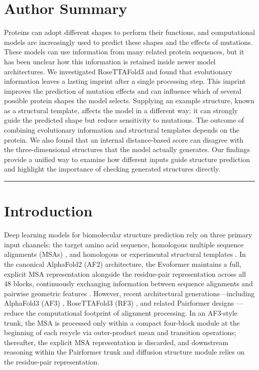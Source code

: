 \documentclass[10pt,a4paper]{article}
\begin{document}
\section*{Author Summary}
Proteins can adopt different shapes to perform their functions, and computational models are increasingly used to predict these shapes and the effects of mutations. These models can use information from many related protein sequences, but it has been unclear how this information is retained inside newer model architectures. We investigated RoseTTAFold3 and found that evolutionary information leaves a lasting imprint after a single processing step. This imprint improves the prediction of mutation effects and can influence which of several possible protein shapes the model selects. Supplying an example structure, known as a structural template, affects the model in a different way: it can strongly guide the predicted shape but reduce sensitivity to mutations. The outcome of combining evolutionary information and structural templates depends on the protein. We also found that an internal distance-based score can disagree with the three-dimensional structures that the model actually generates. Our findings provide a unified way to examine how different inputs guide structure prediction and highlight the importance of checking generated structures directly.

\noindent\textcolor{rulecolor}{\rule{\textwidth}{0.8pt}}

\section{Introduction}

Deep learning models for biomolecular structure prediction rely on three primary input channels: the target amino acid sequence, homologous multiple sequence alignments (MSAs) \citep{marks2012protein,senior2020improved}, and homologous or experimental structural templates \citep{jumper2021highly,abramson2024accurate}. In the canonical AlphaFold2 (AF2) architecture, the Evoformer maintains a full, explicit MSA representation alongside the residue-pair representation across all 48 blocks, continuously exchanging information between sequence alignments and pairwise geometric features \citep{jumper2021highly}. However, recent architectural generations---including AlphaFold3 (AF3) \citep{abramson2024accurate}, RoseTTAFold3 (RF3) \citep{corley2025atomworks}, and related Pairformer designs \citep{akiyama2025scaling}---reduce the computational footprint of alignment processing. In an AF3-style trunk, the MSA is processed only within a compact four-block module at the beginning of each recycle via outer-product mean and transition operations; thereafter, the explicit MSA representation is discarded, and downstream reasoning within the Pairformer trunk and diffusion structure module relies on the residue-pair representation.
\end{document}

